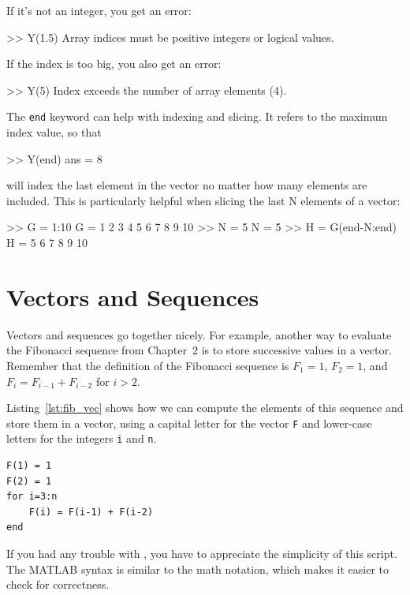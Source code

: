 If it's not an integer, you get an error:

\begin{code}
>> Y(1.5)
Array indices must be positive integers or logical values.
\end{code}

If the index is too big, you also get an error:

\begin{code}
>> Y(5)
Index exceeds the number of array elements (4).
\end{code}

The \lstinline{end} keyword can help with indexing and slicing.  It refers to the maximum index value, so that
\begin{code}
    >> Y(end)
    ans =
         8
\end{code}
will index the last element in the vector no matter how many elements are included.  This is particularly helpful when slicing the last N elements of a vector:
\begin{code}
    >> G = 1:10
    G =
         1     2     3     4     5     6     7     8     9    10
    >> N = 5
    N =
         5
    >> H = G(end-N:end)
    H =
         5     6     7     8     9    10
\end{code}

\section{Vectors and Sequences}
\label{vecseq}


Vectors and sequences go together nicely.
For example, another way to evaluate the Fibonacci sequence from Chapter~2 is to
store successive values in a vector.  Remember that the definition of the
Fibonacci sequence is $F_1 = 1$, $F_2 = 1$, and
$F_{i} = F_{i-1} + F_{i-2}$ for $i > 2$.

Listing~\ref{lst:fib_vec} shows how we can compute the elements of this sequence and store them in a vector, using a capital letter for the vector \lstinline{F}
and lower-case letters for the integers \lstinline{i} and \lstinline{n}.

\begin{lstlisting}[caption={Calculating the Fibonacci sequence using a vector}, label={lst:fib_vec}]
F(1) = 1
F(2) = 1
for i=3:n
    F(i) = F(i-1) + F(i-2)
end
\end{lstlisting}

If you had any trouble with , you have to
appreciate the simplicity of this script.  The MATLAB syntax is
similar to the math notation, which makes it easier to check for
correctness.

